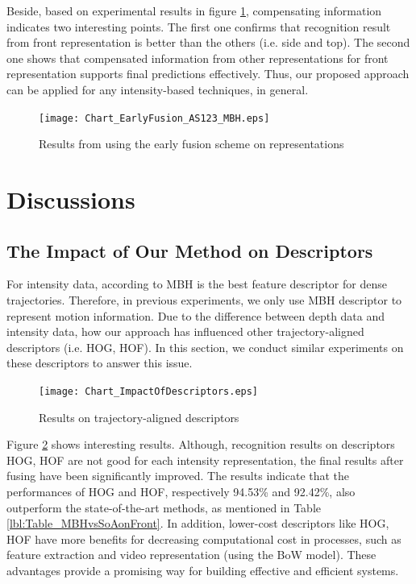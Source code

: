 \documentclass[review]{elsarticle}
\begin{document}
Beside, based on experimental results in figure \ref{lbl:Figure_EarlyFusion_AS123_MBH}, compensating information indicates two interesting points. The first one confirms that recognition result from front representation is better than the others (i.e. side and top). The second one shows that compensated information from other representations for front representation supports final predictions effectively. Thus, our proposed approach can be applied for any intensity-based techniques, in general.

\begin{figure}[H]
	\begin{center}
		\texttt{[image: Chart\_EarlyFusion\_AS123\_MBH.eps]}
	\end{center}
	\caption{\label{lbl:Figure_EarlyFusion_AS123_MBH}Results from using the early fusion scheme on representations}
\end{figure}

\section{Discussions}
\label{lbl:Discussions}

\subsection{The Impact of Our Method on Descriptors}

For intensity data, according to \cite{wang2011densetraj} MBH is the best feature descriptor for dense trajectories. Therefore, in previous experiments, we only use MBH descriptor to represent motion information. Due to the difference between depth data and intensity data, how our approach has influenced other trajectory-aligned descriptors (i.e. HOG, HOF). In this section, we conduct similar experiments on these descriptors to answer this issue.

\begin{figure}[H]
	\begin{center}
		\texttt{[image: Chart\_ImpactOfDescriptors.eps]}
	\end{center}
	\caption{\label{lbl:Figure_MBHHOGHOF}Results on trajectory-aligned descriptors}
\end{figure}

Figure \ref{lbl:Figure_MBHHOGHOF} shows interesting results. Although, recognition results on descriptors HOG, HOF are not good for each intensity representation, the final results after fusing have been significantly improved. The results indicate that the performances of HOG and HOF, respectively 94.53\% and 92.42\%, also outperform the state-of-the-art methods, as mentioned in Table \ref{lbl:Table_MBHvsSoAonFront}. In addition, lower-cost descriptors like HOG, HOF have more benefits for decreasing computational cost in processes, such as feature extraction and video representation (using the BoW model). These advantages provide a promising way for building effective and efficient systems.
\end{document}
